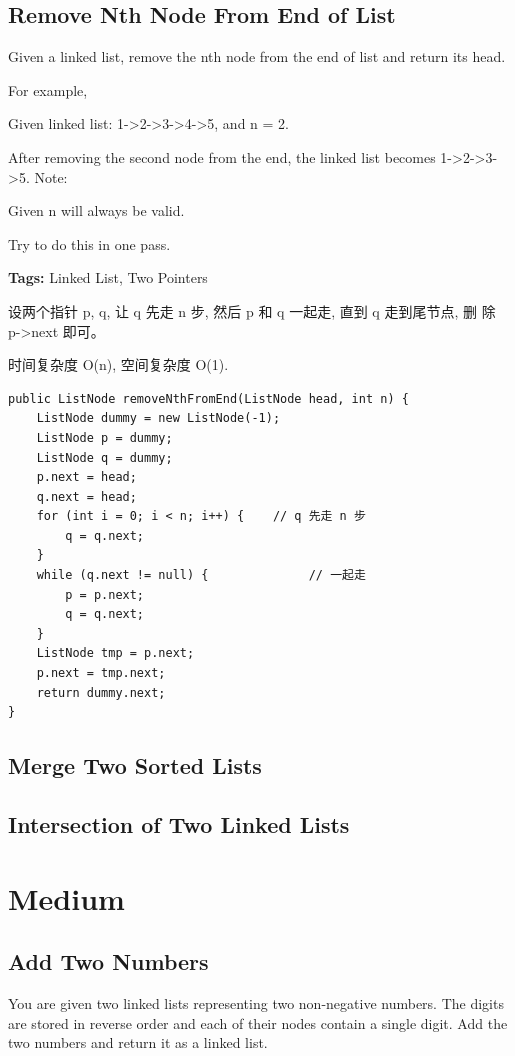 \documentclass[12pt]{book}
\begin{document}
\subsection{Remove Nth Node From End of List}
\label{sec-3-1-2}

Given a linked list, remove the nth node from the end of list and return its head.

For example,

Given linked list: 1->2->3->4->5, and n = 2.

   After removing the second node from the end, the linked list becomes 1->2->3->5.
Note:

Given n will always be valid.

Try to do this in one pass.

\textbf{Tags:} Linked List, Two Pointers

设两个指针 p,  q, 让 q 先走 n 步, 然后 p 和 q 一起走, 直到 q 走到尾节点, 删
除 p->next 即可。

时间复杂度 O(n), 空间复杂度 O(1). 

\lstset{language=java,label= ,caption= ,numbers=none}
\begin{lstlisting}
public ListNode removeNthFromEnd(ListNode head, int n) {
    ListNode dummy = new ListNode(-1);
    ListNode p = dummy;
    ListNode q = dummy;
    p.next = head;
    q.next = head;
    for (int i = 0; i < n; i++) {    // q 先走 n 步
        q = q.next;
    }
    while (q.next != null) {              // 一起走
        p = p.next;
        q = q.next;
    }
    ListNode tmp = p.next;
    p.next = tmp.next;
    return dummy.next;
}
\end{lstlisting}

\subsection{Merge Two Sorted Lists}
\label{sec-3-1-3}
\subsection{Intersection of Two Linked Lists}
\label{sec-3-1-4}
\section{Medium}
\label{sec-3-2}
\subsection{Add Two Numbers}
\label{sec-3-2-1}
You are given two linked lists representing two non-negative numbers. The digits are stored in reverse order and each of their nodes contain a single digit. Add the two numbers and return it as a linked list.
\end{document}
